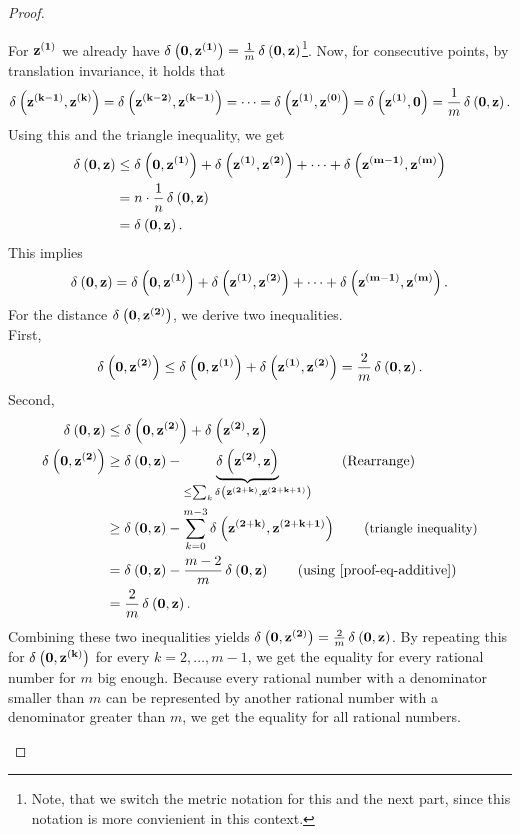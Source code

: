 \begin{proof}
	\begin{proofpart}[$t \metro{\z} = \metro{t \z}$ for $t = \frac{k}{m}$ and $k \in \{0, \dots, m\}$] \label{lemma-part3}
    For $\z[1]$ we already have $\metr{\ve{0}}{\z[1]} = \frac{1}{m} \metr{\ve{0}}{\z}$\footnote{Note, that we switch the metric notation for this and the next part, since this notation is more convienient in this context.}.
		Now, for consecutive points, by translation invariance, it holds that
		$$\metr{\z[k-1]}{\z[k]} = \metr{\z[k-2]}{\z[k-1]} = \dots = \metr{\z[1]}{\z[0]} = \metr{\z[1]}{\ve{0}} = \frac{1}{m} \metr{\ve{0}}{\z}.$$
		Using this and the triangle inequality, we get
		\begin{align*}
			\metr{\ve{0}}{\z} & \leq \metr{\ve{0}}{\z[1]} + \metr{\z[1]}{\z[2]} + \dots + \metr{\z[m-1]}{\z[m]} \\
			                  & = n \cdot \frac{1}{n} \metr{\ve{0}}{\z}                                         \\
			                  & = \metr{\ve{0}}{\z}.
		\end{align*}
		This implies
		\begin{equation} \label{proof-eq-additive}
			\metr{\ve{0}}{\z} = \metr{\ve{0}}{\z[1]} + \metr{\z[1]}{\z[2]} + \dots + \metr{\z[m-1]}{\z[m]}.
		\end{equation}
		For the distance $\metr{\ve{0}}{\z[2]}$, we derive two inequalities.\\
		First,
		\begin{equation*}
			\metr{\ve{0}}{\z[2]} \leq \metr{\ve{0}}{\z[1]} + \metr{\z[1]}{\z[2]} = \frac{2}{m} \metr{\ve{0}}{\z}.
		\end{equation*}
		Second,
		\begin{align}
			\metr{\ve{0}}{\z}    & \leq \metr{\ve{0}}{\z[2]} + \metr{\z[2]}{\z}              \notag                                                   \\
			\metr{\ve{0}}{\z[2]} & \geq \metr{\ve{0}}{\z} - \underbrace{\metr{\z[2]}{\z}}_{\leq \sum_k \metr{\z[2+k]}{\z[2+k+1]}} \tag{Rearrange}     \\
			                     & \geq \metr{\ve{0}}{\z} - \sum_{k=0}^{m-3} \metr{\z[2+k]}{\z[2+k+1]}             \tag{\small triangle inequality}       \\
			                     & = \metr{\ve{0}}{\z} - \frac{m-2}{m} \metr{\ve{0}}{\z}                         \tag{using \cref{proof-eq-additive}} \\
			                     & = \frac{2}{m} \metr{\ve{0}}{\z}. \notag
		\end{align}
		Combining these two inequalities yields $\metr{\ve{0}}{\z[2]} = \frac{2}{m} \metr{\ve{0}}{\z}$.
		By repeating this for $\metr{\ve{0}}{\z[k]}$ for every $k = 2, \dots, m-1$, we get the equality for every rational number for $m$ big enough. Because every rational number with a denominator smaller than $m$ can be represented by another rational number with a denominator greater than $m$, we get the equality for all rational numbers.
	\end{proofpart}



\end{proof}
